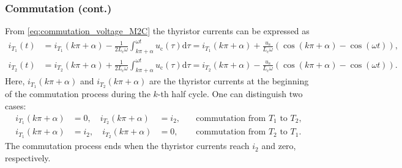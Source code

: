 \begin{frame}[c]
    \frametitle{Commutation (cont.)}
    From \eqref{eq:commutation_voltage_M2C} the thyristor currents can be expressed as
    \begin{equation*}
        \begin{split}
            i_{T_1}(t) &= i_{T_1}(k\pi+\alpha) - \frac{1}{2L_\mathrm{c}\omega}\int_{k\pi+\alpha}^{\omega t} u_{\mathrm{c}}(\tau) \mathrm{d}\tau = i_{T_1}(k\pi+\alpha) + \frac{u_\mathrm{s}}{L_\mathrm{c}\omega}\left(\cos(k\pi+ \alpha)-\cos(\omega t)\right),\\
            i_{T_2}(t) &= i_{T_2}(k\pi+\alpha) + \frac{1}{2L_\mathrm{c}\omega}\int_{k\pi+\alpha}^{\omega t} u_{\mathrm{c}}(\tau) \mathrm{d}\tau = i_{T_2}(k\pi+\alpha) - \frac{u_\mathrm{s}}{L_\mathrm{c}\omega}\left(\cos(k\pi+ \alpha)-\cos(\omega t)\right).
        \end{split}
    \end{equation*} 
    Here, $i_{T_1}(k\pi+\alpha)$ and $i_{T_2}(k\pi+\alpha)$ are the thyristor currents at the beginning of the commutation process during the $k$-th half cycle. One can distinguish two cases:
    \begin{equation*}
        \begin{alignedat}{3}
        i_{T_1}(k\pi+\alpha) &= 0, \quad i_{T_2}(k\pi+\alpha) &=i_2, \quad &\mbox{commutation from $T_1$ to $T_2$},\\
        i_{T_1}(k\pi+\alpha) &= i_2, \quad i_{T_2}(k\pi+\alpha) &= 0, \quad &\mbox{commutation from $T_2$ to $T_1$}.
        \end{alignedat}
    \end{equation*}
    The commutation process ends when the thyristor currents reach $i_2$ and zero, respectively.
\end{frame}

